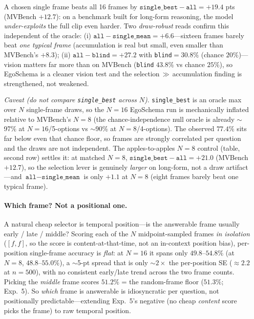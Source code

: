 \documentclass[11pt]{article}
\begin{document}
A chosen single frame beats all 16 frames by $\texttt{single\_best}-\texttt{all}=+19.4$
pts (MVBench $+12.7$): on a benchmark built for long-form reasoning, the model
\emph{under-exploits} the full clip even harder. Two \emph{draw-robust} reads confirm this
independent of the oracle: (i) $\texttt{all}-\texttt{single\_mean}=+6.6$---sixteen frames
barely beat \emph{one typical frame} (accumulation is real but small, even smaller than
MVBench's $+8.3$); (ii) $\texttt{all}-\texttt{blind}=+27.2$ with \texttt{blind}$=30.8\%$
(chance $20\%$)---vision matters far more than on MVBench (\texttt{blind} $43.8\%$ vs
chance $25\%$), so EgoSchema is a cleaner vision test and the
selection$\,\gg\,$accumulation finding is strengthened, not weakened.

\emph{Caveat (do not compare \texttt{single\_best} across $N$).} \texttt{single\_best} is
an oracle max over $N$ single-frame draws, so the $N{=}16$ EgoSchema run is mechanically
inflated relative to MVBench's $N{=}8$ (the chance-independence null oracle is already
$\sim$97\% at $N{=}16$/5-options vs $\sim$90\% at $N{=}8$/4-options). The observed
$77.4\%$ sits far below even that chance floor, so frames are strongly correlated per
question and the draws are not independent. The apples-to-apples $N{=}8$ control (table,
second row) settles it: at matched $N{=}8$, $\texttt{single\_best}-\texttt{all}=+21.0$
(MVBench $+12.7$), so the selection lever is genuinely \emph{larger} on long-form, not a
draw artifact---and $\texttt{all}-\texttt{single\_mean}$ is only $+1.1$ at $N{=}8$ (eight
frames barely beat one typical frame).

\paragraph{Which frame? Not a positional one.} A natural cheap selector is temporal
position---is the answerable frame usually early / late / middle? Scoring each of the $N$
midpoint-sampled frames \emph{in isolation} ($[f,f]$, so the score is content-at-that-time,
not an in-context position bias), per-position single-frame accuracy is \emph{flat}: at
$N{=}16$ it spans only $49.8$--$54.8\%$ (at $N{=}8$, $48.8$--$55.0\%$), a $\sim$5-pt spread
that is only $\sim2\times$ the per-position SE ($\approx2.2$ at $n{=}500$), with no
consistent early/late trend across the two frame counts. Picking the \emph{middle} frame
scores $51.2\%$ = the random-frame floor ($51.3\%$; Exp.~5). So \emph{which} frame is
answerable is idiosyncratic per question, not positionally predictable---extending Exp.~5's
negative (no cheap \emph{content} score picks the frame) to raw temporal position.
\end{document}
